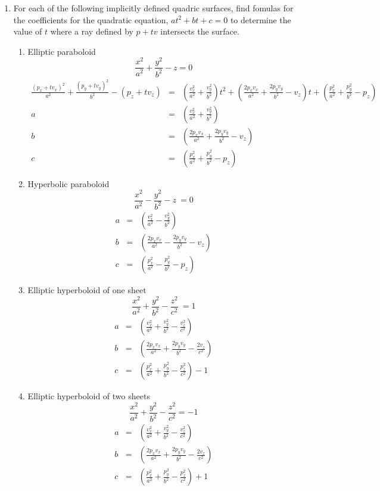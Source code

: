 \documentclass{article}
\begin{document}
\begin{enumerate}
\item For each of the following implicitly defined quadric surfaces,
  find fomulas for  the coefficients  for the quadratic equation,
  $at^2 + bt + c = 0$
  to determine the value of $t$ where a ray defined by $p + tv$
  intersects the surface. 
  \begin{enumerate}
  \item Elliptic paraboloid \[\frac{x^2}{a^2} + \frac{y^2}{b^2} - z =
    0\]
\begin{eqnarray*}
\frac{(p_x +tv_x)^2}{a^2} +\frac{(p_y +tv_y)^2}{b^2} - (p_z +tv_z)
&=&
\left(\frac{v_x^2}{a^2} + \frac{v_y^2}{b^2}\right)t^2
+
\left(\frac{2p_xv_x}{a^2} + \frac{2p_yv_y}{b^2} - v_z\right)t
+
\left(\frac{p_x^2}{a^2} + \frac{p_y^2}{b^2} - {p_z}\right)
\\
a&=&\left(\frac{v_x^2}{a^2} + \frac{v_y^2}{b^2}\right)\\
b&=&\left(\frac{2p_xv_x}{a^2} + \frac{2p_yv_y}{b^2} - v_z\right)\\
c&=&\left(\frac{p_x^2}{a^2} + \frac{p_y^2}{b^2} - {p_z}\right)
\end{eqnarray*}

\item Hyperbolic paraboloid \[\frac{x^2}{a^2} - \frac{y^2}{b^2} - z\ = 0\]
  \begin{eqnarray*}
a&=&\left(\frac{v_x^2}{a^2} - \frac{v_y^2}{b^2}\right)\\
b&=&\left(\frac{2p_xv_x}{a^2} - \frac{2p_yv_y}{b^2} - v_z\right)\\
c&=&\left(\frac{p_x^2}{a^2} - \frac{p_y^2}{b^2} - {p_z}\right)
\end{eqnarray*}


\item Elliptic hyperboloid of one sheet
  \[\frac{x^2}{a^2} + \frac{y^2}{b^2} - \frac{z^2}{c^2}\ = 1\]
  \begin{eqnarray*}
a&=&\left(\frac{v_x^2}{a^2} + \frac{v_y^2}{b^2} - \frac{v_z^2}{c^2}\right)\\
b&=&\left(\frac{2p_xv_x}{a^2} + \frac{2p_yv_y}{b^2} - \frac{2v_z}{c^2}\right)\\
c&=&\left(\frac{p_x^2}{a^2} + \frac{p_y^2}{b^2} - \frac{p_z^2}{c^2}\right)-1
\end{eqnarray*}
  

  \item Elliptic hyperboloid of two sheets
    \[ \frac{x^2}{a^2} + \frac{y^2}{b^2} - \frac{z^2}{c^2} = -1\]
  \begin{eqnarray*}
a&=&\left(\frac{v_x^2}{a^2} + \frac{v_y^2}{b^2} - \frac{v_z^2}{c^2}\right)\\
b&=&\left(\frac{2p_xv_x}{a^2} + \frac{2p_yv_y}{b^2} - \frac{2v_z}{c^2}\right)\\
c&=&\left(\frac{p_x^2}{a^2} + \frac{p_y^2}{b^2} - \frac{p_z^2}{c^2}\right)+1
\end{eqnarray*}
  \end{enumerate}
  

\end{enumerate}
\end{document}
